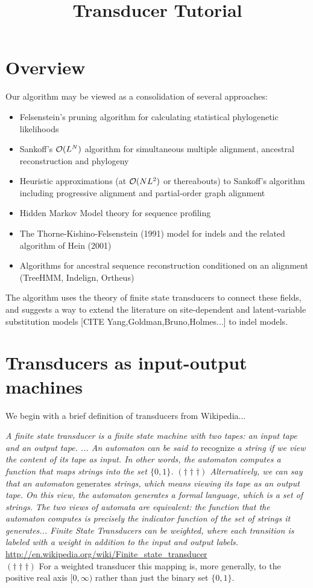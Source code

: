 \documentclass{article}
\newcommand{\needcite}[1]{[CITE #1]}
\begin{document}
\title{Transducer Tutorial}
\date{}
\maketitle

\section{Overview}

Our algorithm may be viewed as a consolidation of several approaches:
\begin{itemize}
\item Felsenstein's pruning algorithm for calculating statistical phylogenetic likelihoods
\item Sankoff's ${\cal O}(L^N)$ algorithm for simultaneous multiple alignment, ancestral reconstruction and phylogeny
\item Heuristic approximations (at ${\cal O}(NL^2)$ or thereabouts) to Sankoff's algorithm including progressive alignment and partial-order graph alignment
\item Hidden Markov Model theory for sequence profiling
\item The Thorne-Kishino-Felsenstein (1991) model for indels and the related algorithm of Hein (2001)
\item Algorithms for ancestral sequence reconstruction conditioned on an alignment (TreeHMM, Indelign, Ortheus)
\end{itemize}

The algorithm uses the theory of finite state transducers to connect these fields,
and suggests a way to extend the literature on
site-dependent and latent-variable substitution models \needcite{Yang,Goldman,Bruno,Holmes...}
to indel models.

\section{Transducers as input-output machines}

We begin with a brief definition of transducers from Wikipedia...

{\em A finite state transducer is a finite state machine with two tapes: an input tape and an output tape. ... An automaton can be said to } recognize {\em a string if we view the content of its tape as input. In other words, the automaton computes a function that maps strings into the set $\{0,1\}$. $(\dagger\dagger\dagger)$ Alternatively, we can say that an automaton } generates {\em strings, which means viewing its tape as an output tape. On this view, the automaton generates a formal language, which is a set of strings. The two views of automata are equivalent: the function that the automaton computes is precisely the indicator function of the set of strings it generates... Finite State Transducers can be weighted, where each transition is labeled with a weight in addition to the input and output labels. }
\url{http://en.wikipedia.org/wiki/Finite_state_transducer}
\\
$(\dagger\dagger\dagger)$ For a weighted transducer this mapping is,
more generally, to the positive real axis $[0,\infty)$
rather than just the binary set $\{0,1\}$.
\end{document}

